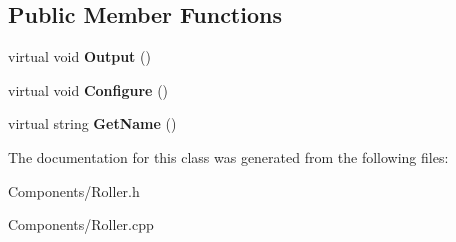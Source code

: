 \subsection*{\-Public \-Member \-Functions}
\begin{DoxyCompactItemize}
\item 
\hypertarget{class_roller_abb59da9d3fbd39e2c1c9fd3afe72ede5}{
virtual void {\bfseries \-Output} ()}
\label{class_roller_abb59da9d3fbd39e2c1c9fd3afe72ede5}

\item 
\hypertarget{class_roller_acb20e60d81cacd2d4f5caf2c5ad228da}{
virtual void {\bfseries \-Configure} ()}
\label{class_roller_acb20e60d81cacd2d4f5caf2c5ad228da}

\item 
\hypertarget{class_roller_a79e4c46cf088983548f3e7455dd021d5}{
virtual string {\bfseries \-Get\-Name} ()}
\label{class_roller_a79e4c46cf088983548f3e7455dd021d5}

\end{DoxyCompactItemize}


\-The documentation for this class was generated from the following files\-:\begin{DoxyCompactItemize}
\item 
\-Components/\-Roller.\-h\item 
\-Components/\-Roller.\-cpp\end{DoxyCompactItemize}
